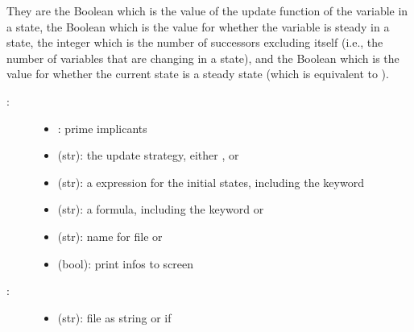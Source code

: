\documentclass[letterpaper,10pt,english]{sphinxmanual}
\begin{document}
\begin{fulllineitems}
They are the Boolean  which is the value of the update function of the variable  in a state,
the Boolean  which is the value for whether the variable  is steady in a state,
the integer  which is the number of successors excluding itself (i.e., the number of variables that are changing in a state), and
the Boolean  which is the value for whether the current state is a steady state (which is equivalent to ).
\begin{description}
\item[{:}] \leavevmode\begin{itemize}
\item {} 
: prime implicants

\item {} 
 (str): the update strategy, either ,  or 

\item {} 
 (str): a {\hyperref[\detokenize{Installation:installation-nusmv}]{}} expression for the initial states, including the keyword 

\item {} 
 (str): a {\hyperref[\detokenize{Installation:installation-nusmv}]{}} formula, including the keyword  or 

\item {} 
 (str): name for  file or 

\item {} 
 (bool): print infos to screen

\end{itemize}

\item[{:}] \leavevmode\begin{itemize}
\item {} 
 (str): file as string or  if 


\end{itemize}
\end{description}
\end{fulllineitems}
\end{document}
